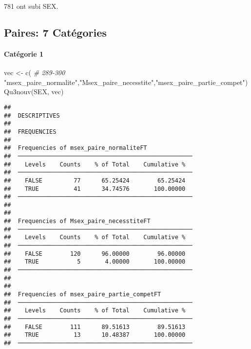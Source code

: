 \documentclass[
]{article}
\newenvironment{Shaded}{\begin{snugshade}}{\end{snugshade}}
\newcommand{\CommentTok}[1]{\textcolor[rgb]{0.56,0.35,0.01}{\textit{#1}}}
\newcommand{\DecValTok}[1]{\textcolor[rgb]{0.00,0.00,0.81}{#1}}
\newcommand{\FunctionTok}[1]{\textcolor[rgb]{0.00,0.00,0.00}{#1}}
\newcommand{\NormalTok}[1]{#1}
\newcommand{\OtherTok}[1]{\textcolor[rgb]{0.56,0.35,0.01}{#1}}
\newcommand{\SpecialCharTok}[1]{\textcolor[rgb]{0.00,0.00,0.00}{#1}}
\newcommand{\StringTok}[1]{\textcolor[rgb]{0.31,0.60,0.02}{#1}}
\begin{document}
\begin{Shaded}
\end{Shaded}

781 ont subi SEX.

\hypertarget{paires-7-catuxe9gories}{%
\subsection{Paires: 7 Catégories}\label{paires-7-catuxe9gories}}

\hypertarget{catuxe9gorie-1-2}{%
\paragraph{Catégorie 1}\label{catuxe9gorie-1-2}}

\begin{Shaded}
\begin{Highlighting}[]
\NormalTok{vec }\OtherTok{\textless{}{-}} \FunctionTok{c}\NormalTok{(   }\CommentTok{\# 289{-}300}
  \StringTok{"msex\_paire\_normalite"}\NormalTok{,}\StringTok{"Msex\_paire\_necesstite"}\NormalTok{,}\StringTok{"msex\_paire\_partie\_compet"}\NormalTok{)}
\FunctionTok{Qu3nouv}\NormalTok{(SEX, vec)}
\end{Highlighting}
\end{Shaded}

\begin{verbatim}
## 
##  DESCRIPTIVES
## 
##  FREQUENCIES
## 
##  Frequencies of msex_paire_normaliteFT              
##  ────────────────────────────────────────────────── 
##    Levels    Counts    % of Total    Cumulative %   
##  ────────────────────────────────────────────────── 
##    FALSE         77      65.25424        65.25424   
##    TRUE          41      34.74576       100.00000   
##  ────────────────────────────────────────────────── 
## 
## 
##  Frequencies of Msex_paire_necesstiteFT             
##  ────────────────────────────────────────────────── 
##    Levels    Counts    % of Total    Cumulative %   
##  ────────────────────────────────────────────────── 
##    FALSE        120      96.00000        96.00000   
##    TRUE           5       4.00000       100.00000   
##  ────────────────────────────────────────────────── 
## 
## 
##  Frequencies of msex_paire_partie_competFT          
##  ────────────────────────────────────────────────── 
##    Levels    Counts    % of Total    Cumulative %   
##  ────────────────────────────────────────────────── 
##    FALSE        111      89.51613        89.51613   
##    TRUE          13      10.48387       100.00000   
##  ──────────────────────────────────────────────────
\end{verbatim}
\end{document}
